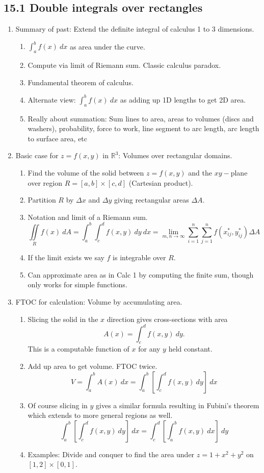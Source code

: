 \documentclass{article}
\newcommand{\ds}{\displaystyle}
\begin{document}
\subsection{15.1 Double integrals over rectangles}
\begin{enumerate}

\item Summary of past: Extend the definite integral of calculus 1 to 3 dimensions. 
\begin{enumerate}
\item $\ds \int_a^b f(x) ~dx$ as area under the curve.
\item Compute via limit of Riemann sum. Classic calculus paradox.
\item Fundamental theorem of calculus.
\item Alternate view: $\ds \int_a^b f(x) ~dx$ as adding up 1D lengths to get 2D area.
\item Really about summation: Sum lines to area, areas to volumes (discs and washers), probability, force to work, line segment to arc length, arc length to surface area, etc
\end{enumerate}

\item Basic case for $z=f(x,y)$ in $\mathbb{R}^3$: Volumes over rectangular domains.
\begin{enumerate}
\item Find the volume of the solid between $z=f(x,y)$ and the $xy-$plane over region $R = [a,b] \times [c,d]$ (Cartesian product).
\item Partition $R$ by $\Delta x$ and $\Delta y$ giving rectangular areas $\Delta A$.
\item Notation and limit of a Riemann sum. 
\[
\iint\limits_R f(x) ~dA = \int_a^b \int_c^d f(x,y) ~dy ~dx = \lim_{m,n \rightarrow \infty} \sum_{i=1}^n \sum_{j=1}^n f(x_{ij}^*, y_{ij}^*) \Delta A 
\]
\item If the limit exists we say $f$ is integrable over $R$.
\item Can approximate area as in Calc 1 by computing the finite sum, though only works for simple functions.
\end{enumerate}

\item FTOC for calculation: Volume by accumulating area.
\begin{enumerate}
\item Slicing the solid in the $x$ direction gives cross-sections with area
\[
A(x) = \int_c^d f(x,y) ~dy.
\]
This is a computable function of $x$ for any $y$ held constant. 
\item Add up area to get volume. FTOC twice.
\[
V = \int_a^b A(x) ~dx = \int_a^b \left[ \int_c^d f(x,y) ~dy \right] ~dx
\]
\item Of course slicing in $y$ gives a similar formula resulting in Fubini's theorem which extends to more general regions as well.
\[
\int_a^b \left[ \int_c^d f(x,y) ~dy \right] ~dx = \int_c^d \left[ \int_a^b f(x,y) ~dx \right] ~dy
\]
\item Examples: Divide and conquer to find the area under $z=1+x^2+y^2$ on $[1,2]\times[0,1]$.
\end{enumerate}


\end{enumerate}
\end{document}
